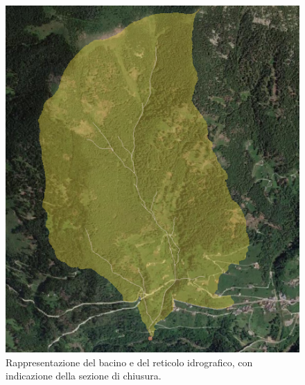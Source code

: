 \begin{figure}[hbt]
    \centering
    \includegraphics[scale=0.60]{immagini/bacino_reticolo_ombreg_qgis.PNG}
    \caption{Rappresentazione del bacino e del reticolo idrografico, con indicazione della sezione di chiusura.}
    \label{figure:bacino_reticolo_qgis}
    \end{figure}

